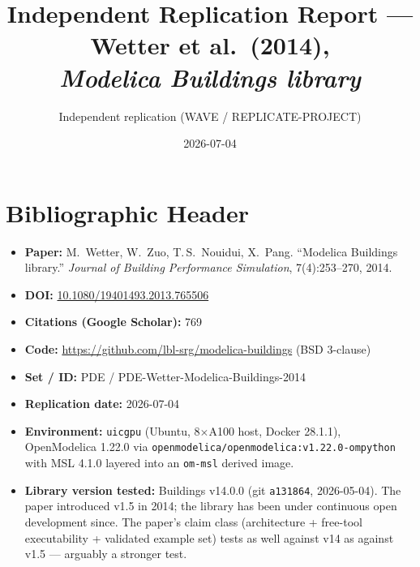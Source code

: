 \documentclass[11pt]{article}
\title{Independent Replication Report --- Wetter et al.\ (2014),\\
\emph{Modelica Buildings library}}
\author{Independent replication (WAVE / REPLICATE-PROJECT)}
\date{2026-07-04}
\begin{document}
\maketitle

\section*{Bibliographic Header}
\begin{itemize}
  \item \textbf{Paper:} M.\ Wetter, W.\ Zuo, T.\,S.\ Nouidui, X.\ Pang.
        ``Modelica Buildings library.''
        \emph{Journal of Building Performance Simulation}, 7(4):253--270, 2014.
  \item \textbf{DOI:} \href{https://doi.org/10.1080/19401493.2013.765506}{10.1080/19401493.2013.765506}
  \item \textbf{Citations (Google Scholar):} 769
  \item \textbf{Code:} \url{https://github.com/lbl-srg/modelica-buildings} (BSD 3-clause)
  \item \textbf{Set / ID:} PDE / PDE-Wetter-Modelica-Buildings-2014
  \item \textbf{Replication date:} 2026-07-04
  \item \textbf{Environment:} \texttt{uicgpu} (Ubuntu, 8$\times$A100 host, Docker 28.1.1),
        OpenModelica 1.22.0 via \texttt{openmodelica/openmodelica:v1.22.0-ompython}
        with MSL 4.1.0 layered into an \texttt{om-msl} derived image.
  \item \textbf{Library version tested:} Buildings v14.0.0
        (git \texttt{a131864}, 2026-05-04).
        The paper introduced v1.5 in 2014;
        the library has been under continuous open development since.
        The paper's claim class
        (architecture + free-tool executability + validated example set)
        tests as well against v14 as against v1.5 --- arguably a stronger test.
\end{itemize}
\end{document}
